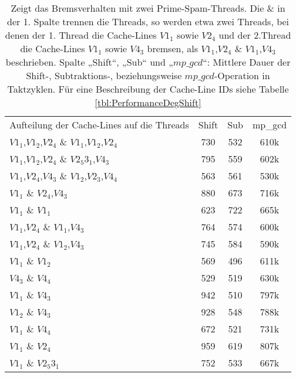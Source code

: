 \begin{table}[h]
\caption{Zeigt das Bremsverhalten mit zwei Prime-Spam-Threads. Die \& in der 1. Spalte trennen die Threads, so werden etwa zwei Threads, bei denen der 1. Thread die Cache-Lines $V1_1$ sowie $V2_4$ und der 2.Thread die Cache-Lines $V1_1$ sowie $V4_3$ bremsen, als $V1_1$,$V2_4$ \& $V1_1$,$V4_3$ beschrieben. Spalte „Shift“, „Sub“ und „$mp\_gcd$“: Mittlere Dauer der Shift-, Subtraktions-, beziehungsweise $mp\_gcd$-Operation in Taktzyklen. Für eine Beschreibung der Cache-Line IDs siehe Tabelle \ref{tbl:PerformanceDegShift}}
\label{tbl:PerformanceDegShiftMultithreadTwo}
\begin{tabular}{lccc}
Aufteilung der Cache-Lines auf die Threads & Shift & Sub & mp\_gcd \\
$V1_1$,$V1_2$,$V2_4$ \& $V1_1$,$V1_2$,$V2_4$                       & 730   & 532 & 610k    \\
$V1_1$,$V1_2$,$V2_4$ \& $V2_5 3_1$,$V4_3$                         & 795   & 559 & 602k    \\
$V1_1$,$V2_4$,$V4_3$ \& $V1_2$,$V2_3$,$V4_4$                     & 563   & 561 & 530k    \\
$V1_1$ \& $V2_4$,$V4_3$                               & 880   & 673 & 716k    \\
$V1_1$ \& $V1_1$                                   & 623   & 722 & 665k    \\
$V1_1$,$V2_4$ \& $V1_1$,$V4_3$                            & 764   & 574 & 600k    \\
$V1_1$,$V2_4$ \& $V1_2$,$V4_3$                            & 745   & 584 & 590k    \\
$V1_1$ \& $V1_2$                                   & 569   & 496 & 611k    \\
$V4_3$ \& $V4_4$                                 & 529   & 519 & 630k    \\
$V1_1$ \& $V4_3$                                  & 942   & 510 & 797k    \\
$V1_2$ \& $V4_3$                                  & 928   & 548 & 788k    \\
$V1_1$ \& $V4_4$                                  & 672   & 521 & 731k    \\
$V1_1$ \& $V2_4$                                   & 959   & 619 & 807k    \\
$V1_1$ \& $V2_5 3_1$                                   & 752   & 533 & 667k    \\
\end{tabular}
\end{table}

